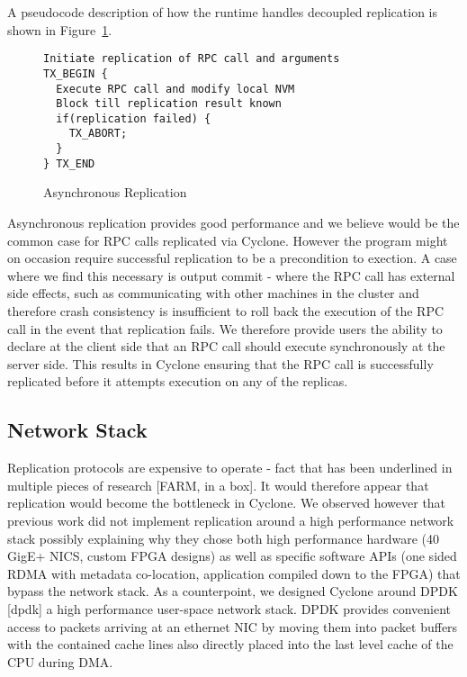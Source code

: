 \documentclass[twocolumn]{article}
\begin{document}
A pseudocode description of how the runtime handles decoupled replication is
shown in Figure~\ref{fig:async_rep}.

\begin{figure}
{ \scriptsize
\begin{verbatim}
Initiate replication of RPC call and arguments
TX_BEGIN {
  Execute RPC call and modify local NVM
  Block till replication result known
  if(replication failed) {
    TX_ABORT;
  }
} TX_END
\end{verbatim}
}
\caption{Asynchronous Replication}
\label{fig:async_rep}
\end{figure}

Asynchronous replication provides good performance and we believe would be the
common case for RPC calls replicated via Cyclone. However the program might on
occasion require successful replication to be a precondition to exection. A case
where we find this necessary is output commit - where the RPC call has external
side effects, such as communicating with other machines in the cluster and
therefore crash consistency is insufficient to roll back the execution of the
RPC call in the event that replication fails. We therefore provide users the
ability to declare at the client side that an RPC call should execute
synchronously at the server side. This results in Cyclone ensuring that the RPC
call is successfully replicated before it attempts execution on any of the
replicas.

\subsection{Network Stack}
Replication protocols are expensive to operate - fact that has been underlined
in multiple pieces of research [FARM, in a box]. It would therefore appear that
replication would become the bottleneck in Cyclone. We observed however that
previous work did not implement replication around a high performance network
stack possibly explaining why they chose both high performance hardware (40
GigE+ NICS, custom FPGA designs) as well as specific software APIs (one sided
RDMA with metadata co-location, application compiled down to the FPGA) that
bypass the network stack. As a counterpoint, we designed Cyclone around DPDK
[dpdk] a high performance user-space network stack. DPDK provides convenient
access to packets arriving at an ethernet NIC by moving them into packet buffers
with the contained cache lines also directly placed into the last level cache of
the CPU during DMA.
\end{document}
